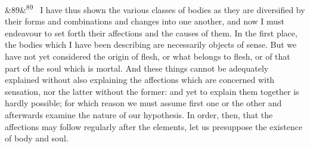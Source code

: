\documentclass[12pt]{article}
\newcommand{\para}[1][]{\par\noindent\ifx&#1&\else\textsuperscript{\footnotesize #1}~\fi}
\begin{document}
\para[89] I have thus shown the various classes of bodies as they are diversified by their forms and combinations and changes into one another, and now I must endeavour to set forth their affections and the causes of them. In the first place, the bodies which I have been describing are necessarily objects of sense. But we have not yet considered the origin of flesh, or what belongs to flesh, or of that part of the soul which is mortal. And these things cannot be adequately explained without also explaining the affections which are concerned with sensation, nor the latter without the former: and yet to explain them together is hardly possible; for which reason we must assume first one or the other and afterwards examine the nature of our hypothesis. In order, then, that the affections may follow regularly after the elements, let us presuppose the existence of body and soul.
\end{document}
